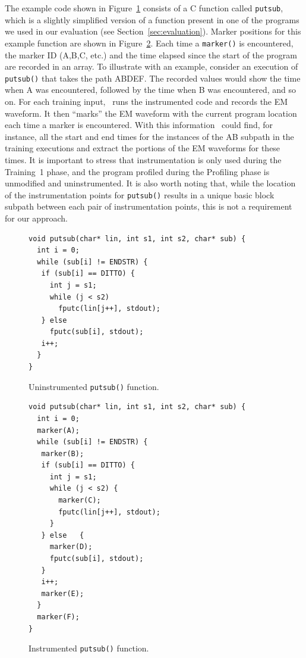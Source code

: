 The example code shown in Figure~\ref{fig:example_code} consists of a C function called \texttt{putsub}, which is a slightly simplified version of a function present in one of the programs we used in our evaluation (see Section~\ref{sec:evaluation}).  Marker positions for this example function are shown in Figure~\ref{fig:segment_match_code}.  Each time a \texttt{marker()} is encountered, the marker ID (\eg A,B,C, etc.)  and the time elapsed since the start of the program are recorded in an array.  To illustrate with an example, consider an execution of \texttt{putsub()} that takes the path ABDEF. The recorded values would show the time when A was encountered, followed by the time when B was encountered, and so on. For each training input, \zop\ runs the instrumented code and records the EM waveform. It then ``marks'' the EM waveform with the current program location each time a marker is encountered. With this information \zop\ could find, for instance, all the start and end times for the instances of the AB subpath in the training executions and extract the portions of the EM waveforms for these times. It is important to stress that instrumentation is only used during the Training~1 phase, and the program profiled during the Profiling phase is unmodified and uninstrumented. It is also worth noting that, while the location of the instrumentation points for \texttt{putsub()} results in a unique basic block subpath between each pair of instrumentation points, this is not a requirement for our approach.

\begin{figure}[tbh]
\begin{small}
\lstset{language=C++,basicstyle=\ttfamily\small,numbers=left}
\begin{lstlisting}[frame=none,xleftmargin=30pt]
void putsub(char* lin, int s1, int s2, char* sub) {
  int i = 0;
  while (sub[i] != ENDSTR) {
   if (sub[i] == DITTO) {
     int j = s1;
     while (j < s2)
       fputc(lin[j++], stdout);
   } else	
     fputc(sub[i], stdout);
   i++;
  }
}
\end{lstlisting}
\caption{Uninstrumented \texttt{putsub()} function.}
\label{fig:example_code}
\end{small}
\end{figure}



\begin{figure}[t]
\begin{small}
\lstset{language=C++,basicstyle=\ttfamily\small,numbers=left}
\begin{lstlisting}[frame=none,xleftmargin=30pt]
void putsub(char* lin, int s1, int s2, char* sub) {
  int i = 0;
  marker(A);
  while (sub[i] != ENDSTR) {
   marker(B);
   if (sub[i] == DITTO) {
     int j = s1;
     while (j < s2) {
       marker(C);
       fputc(lin[j++], stdout);
     }
   } else	{
     marker(D);
     fputc(sub[i], stdout);
   }
   i++;
   marker(E);
  }
  marker(F);
}
\end{lstlisting}
\caption{Instrumented \texttt{putsub()} function.}
\label{fig:segment_match_code}
\end{small}
\end{figure}

